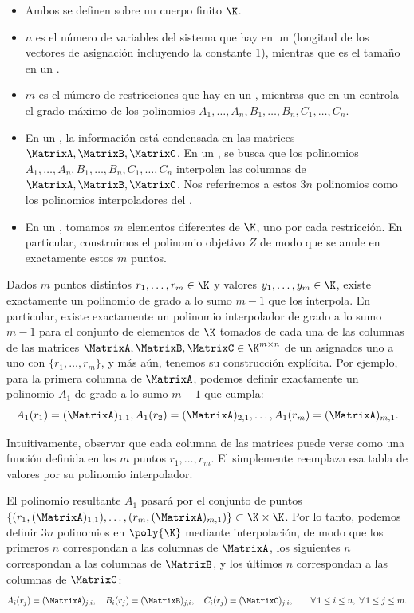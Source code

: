 \begin{itemize}[noitemsep]
	\item Ambos se definen sobre un cuerpo finito $\K$.
	\item $n$ es el número de variables del sistema que hay en un \ROneCS (longitud de los vectores de asignación incluyendo la constante $1$), mientras que es el tamaño en un \QAP.
	\item $m$ es el número de restricciones que hay en un \ROneCS, mientras que en un \QAP controla el grado máximo de los polinomios $A_1, \ldots, A_n, B_1, \ldots, B_n, C_1, \ldots, C_n$.
	\item En un \ROneCS, la información está condensada en las matrices $\MatrixA,\MatrixB,\MatrixC$. En un \QAP, se busca que los polinomios $A_1, \ldots, A_n, B_1, \ldots, B_n, C_1, \ldots, C_n$ interpolen las columnas de $\MatrixA,\MatrixB, \MatrixC$. Nos referiremos a estos $3n$ polinomios como los polinomios interpoladores del \QAP.
	\item En un \QAP, tomamos $m$ elementos diferentes de $\K$, uno por cada restricción. En particular, construimos el polinomio objetivo $Z$ de modo que se anule en exactamente estos $m$ puntos.
\end{itemize}

Dados $m$ puntos distintos $r_1, \ldots, r_m \in \K$ y valores $y_1, \ldots, y_m \in \K$, existe exactamente un polinomio de grado a lo sumo $m - 1$ que los interpola. En particular, existe exactamente un polinomio interpolador de grado a lo sumo $m - 1$ para el conjunto de elementos de $\K$ tomados de cada una de las columnas de las matrices $\MatrixA, \MatrixB, \MatrixC \in \K^{m \times n}$ de un \ROneCS asignados uno a uno con $\{r_1, \ldots, r_m\}$, y más aún, tenemos su construcción explícita. Por ejemplo, para la primera columna de $\MatrixA$, podemos definir exactamente un polinomio $A_1$ de grado a lo sumo $m - 1$ que cumpla:
$$A_1(r_1) = (\MatrixA)_{1,1}, A_1(r_2) = (\MatrixA)_{2,1}, \ldots, A_1(r_m) = (\MatrixA)_{m,1}.$$

Intuitivamente, observar que cada columna de las matrices puede verse como una función definida en los $m$ puntos $r_1, \ldots, r_m$. El \QAP simplemente reemplaza esa tabla de valores por su polinomio interpolador.

El polinomio resultante $A_1$ pasará por el conjunto de puntos $\{(r_1, (\MatrixA)_{1,1}), \ldots, (r_m, (\MatrixA)_{m,1})\} \subset \K \times \K$. Por lo tanto, podemos definir $3n$ polinomios en $\poly{\K}$ mediante interpolación, de modo que los primeros $n$ correspondan a las columnas de $\MatrixA$, los siguientes $n$ correspondan a las columnas de $\MatrixB$, y los últimos $n$ correspondan a las columnas de $\MatrixC$:
$$A_i(r_j) = (\MatrixA)_{j,i}, \quad B_i(r_j) = (\MatrixB)_{j,i}, \quad C_i(r_j) = (\MatrixC)_{j,i}, \qquad \forall\, 1 \leq i \leq n,\ \forall\, 1 \leq j \leq m.$$

